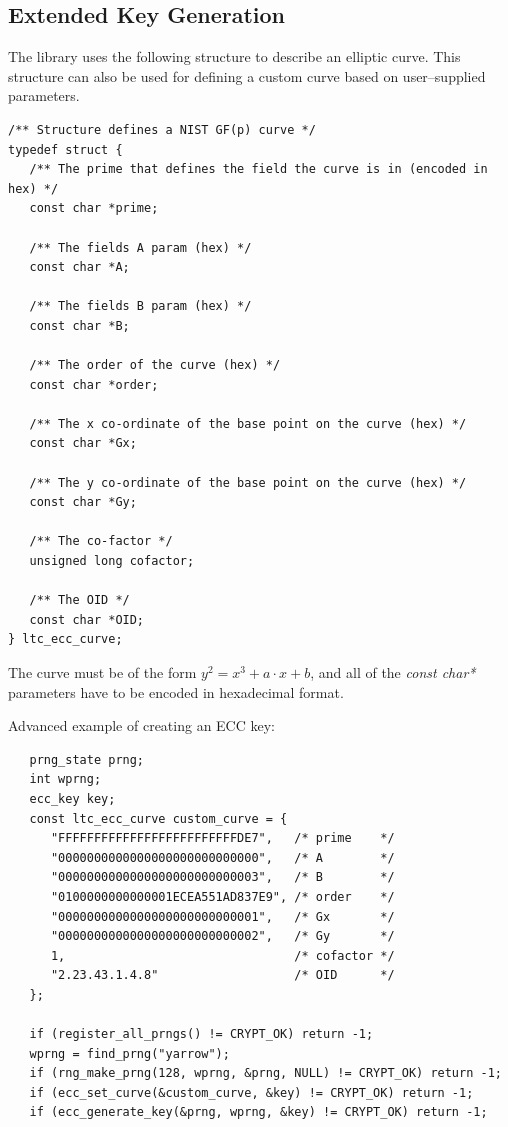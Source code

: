 \documentclass[synpaper]{book}
\begin{document}
\subsection{Extended Key Generation}

The library uses the following structure to describe an elliptic curve.
This structure can also be used for defining a custom curve based on user--supplied parameters.

\begin{verbatim}
/** Structure defines a NIST GF(p) curve */
typedef struct {
   /** The prime that defines the field the curve is in (encoded in hex) */
   const char *prime;

   /** The fields A param (hex) */
   const char *A;

   /** The fields B param (hex) */
   const char *B;

   /** The order of the curve (hex) */
   const char *order;

   /** The x co-ordinate of the base point on the curve (hex) */
   const char *Gx;

   /** The y co-ordinate of the base point on the curve (hex) */
   const char *Gy;

   /** The co-factor */
   unsigned long cofactor;

   /** The OID */
   const char *OID;
} ltc_ecc_curve;
\end{verbatim}

The curve must be of the form $y^2 = x^3 + a \cdot x + b$, and all of the \textit{const char*} parameters have to be encoded in hexadecimal format.

Advanced example of creating an ECC key:
\begin{small}
\begin{verbatim}
   prng_state prng;
   int wprng;
   ecc_key key;
   const ltc_ecc_curve custom_curve = {
      "FFFFFFFFFFFFFFFFFFFFFFFFFDE7",   /* prime    */
      "0000000000000000000000000000",   /* A        */
      "0000000000000000000000000003",   /* B        */
      "0100000000000001ECEA551AD837E9", /* order    */
      "0000000000000000000000000001",   /* Gx       */
      "0000000000000000000000000002",   /* Gy       */
      1,                                /* cofactor */
      "2.23.43.1.4.8"                   /* OID      */
   };

   if (register_all_prngs() != CRYPT_OK) return -1;
   wprng = find_prng("yarrow");
   if (rng_make_prng(128, wprng, &prng, NULL) != CRYPT_OK) return -1;
   if (ecc_set_curve(&custom_curve, &key) != CRYPT_OK) return -1;
   if (ecc_generate_key(&prng, wprng, &key) != CRYPT_OK) return -1;
\end{verbatim}
\end{small}
\end{document}
